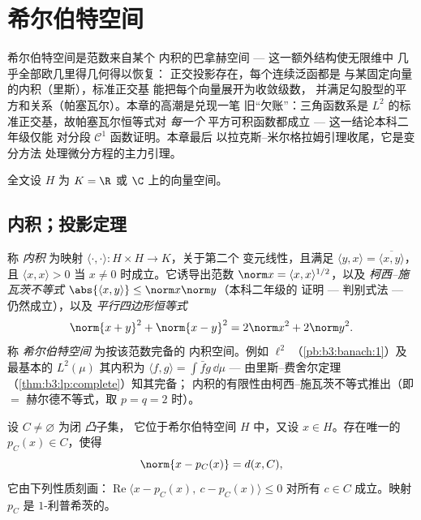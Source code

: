 \chapter{希尔伯特空间}\label{ch:b3:hilbert}

希尔伯特空间是范数来自某个
内积的巴拿赫空间 --- 这一额外结构使无限维中
几乎全部欧几里得几何得以恢复：
正交投影存在，每个连续泛函都是
与某固定向量的内积（里斯），标准正交基
能把每个向量展开为收敛级数，
并满足勾股型的平方和关系（帕塞瓦尔）。本章的高潮是兑现一笔
旧“欠账”：三角函数系是
$L^2$ 的标准正交基，故帕塞瓦尔恒等式对 \emph{每一个}
平方可积函数都成立 --- 这一结论本科二年级仅能
对分段 $\mathcal C^1$ 函数证明。本章最后
以拉克斯–米尔格拉姆引理收尾，它是变分方法
处理微分方程的主力引理。

全文设 $H$ 为 $K = \R$ 或 $\C$ 上的向量空间。

\section{内积；投影定理}

\begin{definition}\label{def:b3:hilbert:inner}
称 \emph{内积} 为映射 $\langle
\cdot,\cdot\rangle \colon H\times H \to K$，关于第二个
变元线性，且满足 $\langle y, x\rangle =
\overline{\langle x, y\rangle}$，且 $\langle x, x\rangle > 0$
当 $x \neq 0$ 时成立。它诱导出范数 $\norm x = \langle x,
x\rangle^{1/2}$，以及 \emph{柯西–施瓦茨不等式}
$\abs{\langle x, y\rangle} \leq \norm x\norm y$（本科二年级的
证明 --- 判别式法 --- 仍然成立），以及
\emph{平行四边形恒等式}
\[
\norm{x + y}^2 + \norm{x - y}^2 = 2\norm x^2 + 2\norm y^2 .
\]
称 \emph{希尔伯特空间} 为按该范数完备的
内积空间。例如 $\ell^2$
（\cref{pb:b3:banach:1}）及最基本的 $L^2(\mu)$
其内积为 $\langle f, g\rangle = \int\bar fg\,\dd\mu$ ---
由里斯–费舍尔定理（\cref{thm:b3:lp:complete}）知其完备；
内积的有限性由柯西–施瓦茨不等式推出（即 $= $ 赫尔德不等式，取
$p = q = 2$ 时）。
\end{definition}

\begin{theorem}[向闭凸集的投影]
\label{thm:b3:hilbert:projection}
设 $C \neq \varnothing$ 为闭 \emph{凸}子集，
它位于希尔伯特空间 $H$ 中，又设 $x \in H$。存在唯一的 $p_C(x)
\in C$，使得
\[
\norm{x - p_C(x)} = d(x, C),
\]
它由下列性质刻画：$\operatorname{Re}\langle x - p_C(x),\ c -
p_C(x)\rangle \leq 0$ 对所有 $c \in C$ 成立。映射 $p_C$ 是
$1$-利普希茨的。
\end{theorem}

